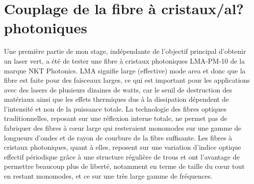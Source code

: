 \documentclass[11pt,a4paper] { article}
\begin{document}
\section{Couplage de la fibre à cristaux/al? photoniques}
Une première partie de mon stage, indépendante de l'objectif principal d'obtenir un laser vert, a été de tester une fibre à cristaux photoniques
LMA-PM-10 de la marque NKT Photonics. LMA signifie large (effective) mode area et donc que la fibre est faite pour des faisceaux larges, ce qui est important pour les applications avec des lasers de plusieurs dizaines de watts, car le seuil de destruction des matériaux ainsi que les effets thermiques dus à la dissipation dépendent de l'intensité et non de la puissance totale.
La technologie des fibres optiques traditionnelles, reposant sur une réflexion interne totale, ne permet pas de fabriquer des fibres à c\oe ur large qui resteraient monomodes sur une gamme de longueurs d'ondes et de rayon de courbure de la fibre suffisante. 
Les fibres à cristaux photoniques, quant à elles, reposent sur une variation d'indice optique effectif périodique grâce à une structure régulière de trous et ont l'avantage de permettre beaucoup plus de liberté, notamment en terme de taille du c\oe ur tout en restant monomodes, et ce sur une très large gamme de fréquences.  
\citep{russell2006,russell2007}

\end{document}
